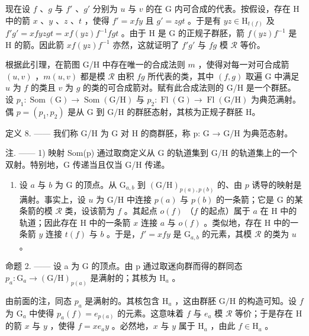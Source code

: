 现在设 \(f\) 、\(g\) 与 \(f'\) 、\(g'\) 分别为 \(u\) 与 \(v\) 的在 G 内可合成的代表。按假设，存在 H 中的箭 \(x\) 、\(y\) 、\(z\) 、\(t\) ，使得 \(f' = xfy\) 且 \(g' = zgt\) 。于是有 \(yz \in \mathrm{H}_{t(f)}\) 及 \(f'g' = x f y z g t = x f(yz)f^{-1}f g t\) 。由于 H 是 G 的正规子群胚，箭 \(f(yz)f^{-1}\) 是 H 的箭。因此箭 \(x f(yz)f^{-1}\) 亦然，这就证明了 \(f'g'\) 与 \(fg\) 模 \(\mathcal{R}\) 等价。

根据此引理，在箭图 G/H 中存在唯一的合成法则 \(m\) ，使得对每一对可合成箭 \((u,v)\) ，\(m(u,v)\) 都是模 \(\mathcal{R}\) 由积 \(fg\) 所代表的类，其中 \((f,g)\) 取遍 G 中满足 \(u\) 为 \(f\) 的类且 \(v\) 为 \(g\) 的类的可合成箭对。赋有此合成法则的 G/H 是一个群胚。设 \(p_1\colon \operatorname{Som}(\mathrm{G}) \to \operatorname{Som}(\mathrm{G}/\mathrm{H})\) 与 \(p_2\colon \operatorname{Fl}(\mathrm{G}) \to \operatorname{Fl}(\mathrm{G}/\mathrm{H})\) 为典范满射。偶 \(p = (p_1,p_2)\) 是从 G 到 G/H 的群胚态射，其核为正规子群胚 H。

定义 8. —— 我们称 G/H 为 G 对 H 的商群胚，称 p: G → G/H 为典范态射。

注. —— 1) 映射 Som(p) 通过取商定义从 G 的轨道集到 G/H 的轨道集上的一个双射。特别地，G 传递当且仅当 G/H 传递。

\begin{enumerate}
\def\labelenumi{\arabic{enumi})}
\setcounter{enumi}{1}
\tightlist
\item
  设 \(a\) 与 \(b\) 为 G 的顶点。从 \(\mathrm{G}_{a,b}\) 到 \((\mathrm{G} / \mathrm{H})_{p(a),p(b)}\) 的、由 \(p\) 诱导的映射是满射。事实上，设 \(u\) 为 G/H 中连接 \(p(a)\) 与 \(p(b)\) 的一条箭；它是 G 的某条箭的模 \(\mathcal{R}\) 类，设该箭为 \(f\) 。其起点 \(o(f)\) （\(f\) 的起点）属于 \(a\) 在 H 中的轨道；因此存在 H 中的一条箭 \(x\) 连接 \(a\) 与 \(o(f)\) 。类似地，存在 H 中的一条箭 \(y\) 连接 \(t(f)\) 与 \(b\) 。于是，\(f' = xfy\) 是 \(\mathrm{G}_{a,b}\) 的元素，其模 \(\mathcal{R}\) 的类为 \(u\) 。
\end{enumerate}

命题 2. —— 设 a 为 G 的顶点。由 p 通过取迷向群而得的群同态 \(p_{a}\colon\mathrm{G}_{a}\to(\mathrm{G}/\mathrm{H})_{p(a)}\) 是满射的；其核为 \(\mathrm{H}_{a}\) 。

由前面的注，同态 \(p_a\) 是满射的。其核包含 \(\mathrm{H}_a\) ，这由群胚 \(\mathrm{G / H}\) 的构造可知。设 \(f\) 为 \(\mathrm{G}_a\) 中使得 \(p_a(f) = e_{p(a)}\) 的元素。这意味着 \(f\) 与 \(e_a\) 模 \(\mathcal{R}\) 等价；于是存在 H 的箭 \(x\) 与 \(y\) ，使得 \(f = xe_a y\) 。必然地，\(x\) 与 \(y\) 属于 \(\mathrm{H}_a\) ，由此 \(f \in \mathrm{H}_a\) 。

